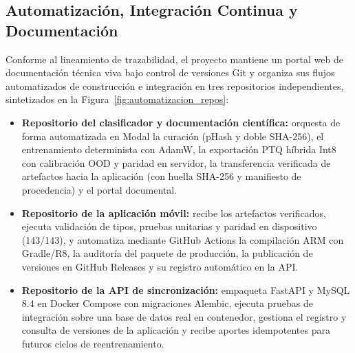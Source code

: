 \subsection{Automatizaci\'on, Integraci\'on Continua y Documentaci\'on}
Conforme al lineamiento de trazabilidad, el proyecto mantiene un portal web de documentaci\'on t\'ecnica viva bajo control de versiones Git y organiza sus flujos automatizados de construcci\'on e integraci\'on en tres repositorios independientes, sintetizados en la Figura~\ref{fig:automatizacion_repos}:
\begin{itemize}\setlength{\itemsep}{2pt}
\item \textbf{Repositorio del clasificador y documentaci\'on cient\'ifica:} orquesta de forma automatizada en Modal la curaci\'on (pHash y doble SHA-256), el entrenamiento determinista con AdamW, la exportaci\'on PTQ h\'ibrida Int8 con calibraci\'on OOD y paridad en servidor, la transferencia verificada de artefactos hacia la aplicaci\'on (con huella SHA-256 y manifiesto de procedencia) y el portal documental.
\item \textbf{Repositorio de la aplicaci\'on m\'ovil:} recibe los artefactos verificados, ejecuta validaci\'on de tipos, pruebas unitarias y paridad en dispositivo (143/143), y automatiza mediante GitHub Actions la compilaci\'on ARM con Gradle/R8, la auditor\'ia del paquete de producci\'on, la publicaci\'on de versiones en GitHub Releases y su registro autom\'atico en la API.
\item \textbf{Repositorio de la API de sincronizaci\'on:} empaqueta FastAPI y MySQL 8.4 en Docker Compose con migraciones Alembic, ejecuta pruebas de integraci\'on sobre una base de datos real en contenedor, gestiona el registro y consulta de versiones de la aplicaci\'on y recibe aportes idempotentes para futuros ciclos de reentrenamiento.
\end{itemize}

